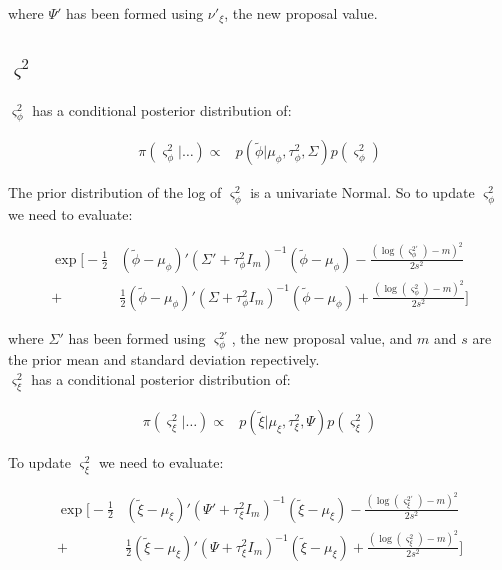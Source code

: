 \documentclass{article}
\begin{document}
where $\Psi'$ has been formed using $\nu'_\xi$, the new proposal value. \\

\subsection{$\varsigma^2$}

$\varsigma^2_\phi$ has a conditional posterior distribution of:

\begin{align*}
\pi(\varsigma^2_\phi | \dots ) \propto & p(\tilde{\phi} | \mu_\phi, \tau^2_\phi, \Sigma) p(\varsigma^2_\phi)
\end{align*}

The prior distribution of the log of $\varsigma^2_\phi$ is a univariate Normal. So to update $\varsigma^2_\phi$ we need to evaluate:

\begin{align}
\exp \Bigg[ -\frac{1}{2} & (\tilde{\phi} - \mu_\phi)' (\Sigma' + \tau^2_\phi I_m)^{-1} (\tilde{\phi} - \mu_\phi) - \frac{(\log(\varsigma^{2'}_\phi) - m)^2}{2 s^2} \nonumber \\
+ & \frac{1}{2} (\tilde{\phi} - \mu_\phi)' (\Sigma + \tau^2_\phi I_m)^{-1} (\tilde{\phi} - \mu_\phi) + \frac{(\log(\varsigma^2_\phi) - m)^2}{2 s^2} \Bigg] \label{eq:2vs1}
\end{align}

where $\Sigma'$ has been formed using $\varsigma^{2'}_\phi$, the new proposal value, and $m$ and $s$ are the prior mean and standard deviation repectively. \\

$\varsigma^2_\xi$ has a conditional posterior distribution of:

\begin{align*}
\pi(\varsigma^2_\xi | \dots ) \propto & p(\tilde{\xi} | \mu_\xi, \tau^2_\xi, \Psi) p(\varsigma^2_\xi)
\end{align*}

To update $\varsigma^2_\xi$ we need to evaluate:

\begin{align}
\exp \Bigg[ -\frac{1}{2} & (\tilde{\xi} - \mu_\xi)' (\Psi' + \tau^2_\xi I_m)^{-1} (\tilde{\xi} - \mu_\xi) - \frac{(\log(\varsigma^{2'}_\xi) - m)^2}{2 s^2} \nonumber \\
+ & \frac{1}{2} (\tilde{\xi} - \mu_\xi)' (\Psi + \tau^2_\xi I_m)^{-1} (\tilde{\xi} - \mu_\xi) + \frac{(\log(\varsigma^2_\xi) - m)^2}{2 s^2} \Bigg] \label{eq:2vs2}
\end{align}
\end{document}
